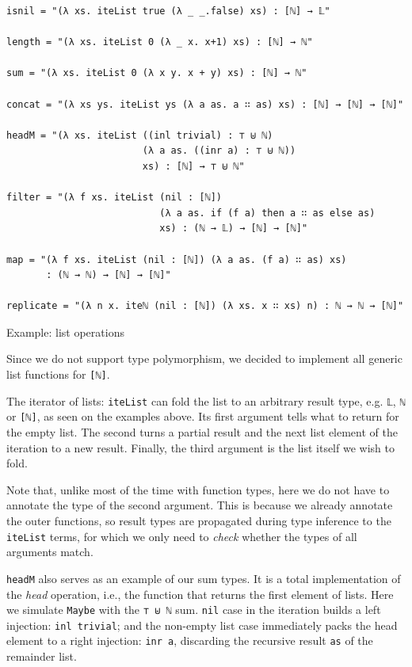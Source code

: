 \begin{listing}[H]
\begin{verbatim}
isnil = "(λ xs. iteList true (λ _ _.false) xs) : [ℕ] → 𝕃"

length = "(λ xs. iteList 0 (λ _ x. x+1) xs) : [ℕ] → ℕ"

sum = "(λ xs. iteList 0 (λ x y. x + y) xs) : [ℕ] → ℕ"

concat = "(λ xs ys. iteList ys (λ a as. a ∷ as) xs) : [ℕ] → [ℕ] → [ℕ]"

headM = "(λ xs. iteList ((inl trivial) : ⊤ ⊎ ℕ)
                        (λ a as. ((inr a) : ⊤ ⊎ ℕ))
                        xs) : [ℕ] → ⊤ ⊎ ℕ"

filter = "(λ f xs. iteList (nil : [ℕ])
                           (λ a as. if (f a) then a ∷ as else as)
                           xs) : (ℕ → 𝕃) → [ℕ] → [ℕ]"

map = "(λ f xs. iteList (nil : [ℕ]) (λ a as. (f a) ∷ as) xs)
       : (ℕ → ℕ) → [ℕ] → [ℕ]"

replicate = "(λ n x. iteℕ (nil : [ℕ]) (λ xs. x ∷ xs) n) : ℕ → ℕ → [ℕ]"
\end{verbatim}
\caption{Example: list operations}
\label{code:examples-lists}
\end{listing}

Since we do not support type polymorphism, we decided to implement all generic list functions for \verb$[ℕ]$.

The iterator of lists: \verb$iteList$ can fold the list to an arbitrary result type, e.g. \verb$𝕃$, \verb$ℕ$ or \verb$[ℕ]$, as seen on the examples above. Its first argument tells what to return for the empty list. The second turns a partial result and the next list element of the iteration to a new result. Finally, the third argument is the list itself we wish to fold.

Note that, unlike most of the time with function types, here we do not have to annotate the type of the second argument. This is because we already annotate the outer functions, so result types are propagated during type inference to the \verb$iteList$ terms, for which we only need to \textit{check} whether the types of all arguments match.

\verb$headM$ also serves as an example of our sum types. It is a total implementation of the \textit{head} operation, i.e., the function that returns the first element of lists. Here we simulate \verb$Maybe$ with the \verb$⊤ ⊎ ℕ$ sum. \verb$nil$ case in the iteration builds a left injection: \verb$inl trivial$; and the non-empty list case immediately packs the head element to a right injection: \verb$inr a$, discarding the recursive result \verb$as$ of the remainder list.

